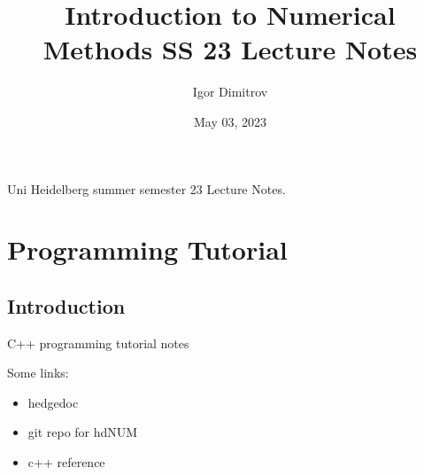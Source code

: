 \documentclass[a4paper,10pt,english]{jupyterBook}
\title{Introduction to Numerical Methods SS 23 Lecture Notes}
\date{May 03, 2023}
\author{Igor Dimitrov}
\begin{document}
\pagestyle{empty}
\sphinxmaketitle
\pagestyle{plain}
\sphinxtableofcontents
\pagestyle{normal}
\label{\detokenize{text/intro::doc}}


\sphinxAtStartPar
{} Uni Heidelberg summer semester 23 Lecture Notes.

\sphinxstepscope


\part{Programming Tutorial}

\sphinxstepscope


\chapter{Introduction}
\label{\detokenize{text/progtut/intro:introduction}}\label{\detokenize{text/progtut/intro::doc}}
\sphinxAtStartPar
C++ programming tutorial notes

\sphinxAtStartPar
Some links:
\begin{itemize}
\item {} 
\sphinxAtStartPar
hedgedoc 

\item {} 
\sphinxAtStartPar
git repo for hdNUM 

\item {} 
\sphinxAtStartPar
c++ reference 

\end{itemize}

\sphinxstepscope
\end{document}
